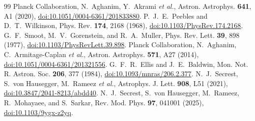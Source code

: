 \documentclass[aps,prd,reprint,amsmath,amssymb,superscriptaddress]{revtex4-2}
\begin{document}
\begin{thebibliography}{99}
 Planck Collaboration, N.~Aghanim, Y.~Akrami \textit{et al.}, Astron. Astrophys. \textbf{641}, A1 (2020), \href{https://doi.org/10.1051/0004-6361/201833880}{doi:10.1051/0004-6361/201833880}.
 P.~J.~E.~Peebles and D.~T.~Wilkinson, Phys. Rev. \textbf{174}, 2168 (1968), \href{https://doi.org/10.1103/PhysRev.174.2168}{doi:10.1103/PhysRev.174.2168}.
 G.~F.~Smoot, M.~V.~Gorenstein, and R.~A.~Muller, Phys. Rev. Lett. \textbf{39}, 898 (1977), \href{https://doi.org/10.1103/PhysRevLett.39.898}{doi:10.1103/PhysRevLett.39.898}.
 Planck Collaboration, N.~Aghanim, C.~Armitage-Caplan \textit{et al.}, Astron. Astrophys. \textbf{571}, A27 (2014), \href{https://doi.org/10.1051/0004-6361/201321556}{doi:10.1051/0004-6361/201321556}.
 G.~F.~R.~Ellis and J.~E.~Baldwin, Mon. Not. R. Astron. Soc. \textbf{206}, 377 (1984), \href{https://doi.org/10.1093/mnras/206.2.377}{doi:10.1093/mnras/206.2.377}.
 N.~J.~Secrest, S.~von Hausegger, M.~Rameez \textit{et al.}, Astrophys. J. Lett. \textbf{908}, L51 (2021), \href{https://doi.org/10.3847/2041-8213/abdd40}{doi:10.3847/2041-8213/abdd40}.
 N.~J.~Secrest, S.~von Hausegger, M.~Rameez, R.~Mohayaee, and S.~Sarkar, Rev. Mod. Phys. \textbf{97}, 041001 (2025), \href{https://doi.org/10.1103/9ygx-z2yq}{doi:10.1103/9ygx-z2yq}.

\end{thebibliography}
\end{document}
